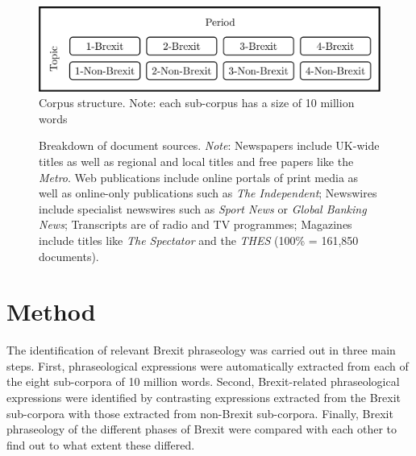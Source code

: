 \documentclass[output=paper]{langscibook}
\begin{document}
\begin{figure}
\includegraphics[width=\textwidth]{figures/buerki-figure1.pdf}
\caption{Corpus structure. Note: each sub-corpus has a size of 10 million words\label{fig:buerki:1}}
\end{figure}

  
\begin{figure}
\caption{Breakdown of document sources. \emph{Note}: Newspapers include UK-wide titles as well as regional and local titles and free papers like the \textit{Metro}. Web publications include online portals of print media as well as online-only publications such as \textit{The Independent}; Newswires include specialist newswires such as \textit{Sport News} or \textit{Global Banking News}; Transcripts are of radio and TV programmes; Magazines include titles like \textit{The Spectator} and the \textit{THES} (100\% = 161,850 documents).\label{fig:buerki:2}}
\end{figure}

\section{Method}

The identification of relevant Brexit phraseology was carried out in three main steps. First, phraseological expressions were automatically extracted from each of the eight sub-corpora of 10 million words. Second, Brexit-related phraseological expressions were identified by contrasting expressions extracted from the Brexit sub-corpora with those extracted from non-Brexit sub-corpora. Finally, Brexit phraseology of the different phases of Brexit were compared with each other to find out to what extent these differed.
\end{document}
